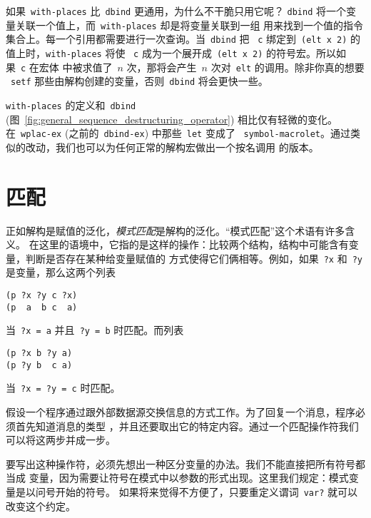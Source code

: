如果~\texttt{with-places} 比~\texttt{dbind} 更通用，为什么不干脆只用它呢？
\texttt{dbind} 将一个变量关联一个值上，而~\texttt{with-places} 却是将变量关联到一组
用来找到一个值的指令集合上。每一个引用都需要进行一次查询。当~\texttt{dbind} 把
~\texttt{c} 绑定到~\texttt{(elt x 2)} 的值上时，\texttt{with-places} 将使
~\texttt{c} 成为一个展开成~\texttt{(elt x 2)} 的符号宏。所以如果~\texttt{c} 在宏体
中被求值了~$n$ 次，那将会产生~$n$ 次对~\texttt{elt} 的调用。除非你真的想要
~\texttt{setf} 那些由解构创建的变量，否则~\texttt{dbind} 将会更快一些。

\texttt{with-places} 的定义和~\texttt{dbind}
(图~\ref{fig:general_sequence_destructuring_operator}) 相比仅有轻微的变化。
在~\texttt{wplac-ex} (之前的~\texttt{dbind-ex}) 中那些~\texttt{let} 变成了
~\texttt{symbol-macrolet}。通过类似的改动，我们也可以为任何正常的解构宏做出一个按名调用
的版本。

\section{匹配}
\label{sec:destructuring:matching}

正如解构是赋值的泛化，\emph{模式匹配}是解构的泛化。“模式匹配”这个术语有许多含义。
在这里的语境中，它指的是这样的操作：比较两个结构，结构中可能含有变量，判断是否存在某种给变量赋值的
方式使得它们俩相等。例如，如果~\texttt{?x} 和~\texttt{?y} 是变量，那么这两个列表
\begin{lstlisting}
(p ?x ?y c ?x)
(p  a  b c  a)
\end{lstlisting}
当~\texttt{?x = a} 并且~\texttt{?y = b} 时匹配。而列表
\begin{lstlisting}
(p ?x b ?y a)
(p ?y b  c a)
\end{lstlisting}
当~\texttt{?x = ?y = c} 时匹配。

假设一个程序通过跟外部数据源交换信息的方式工作。为了回复一个消息，程序必须首先知道消息的类型
，并且还要取出它的特定内容。通过一个匹配操作符我们可以将这两步并成一步。

要写出这种操作符，必须先想出一种区分变量的办法。我们不能直接把所有符号都当成
变量，因为需要让符号在模式中以参数的形式出现。这里我们规定：模式变量是以问号开始的符号。
如果将来觉得不方便了，只要重定义谓词~\texttt{var?} 就可以改变这个约定。

